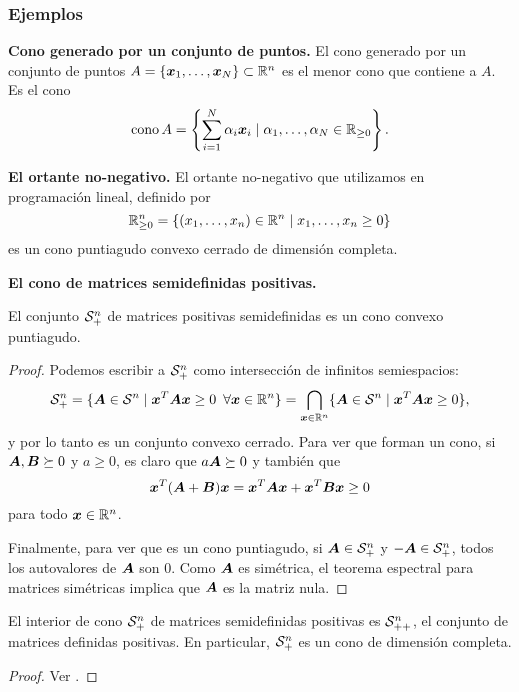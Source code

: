 \subsubsection{Ejemplos}

\noindent\textbf{Cono generado por un conjunto de puntos.}
El cono generado por un conjunto de puntos $A = \{\bm{x}_1, \dots, \bm{x}_N\} \subset \mathbb{R}^n$ es el menor cono que contiene a $A$. Es el cono
$$
\operatorname{cono} A = \left\{ \sum_{i=1}^N \alpha_i \bm{x}_i \mid \alpha_1, \dots, \alpha_N \in \mathbb{R}_{\ge 0}\right\}.
$$

\noindent\textbf{El ortante no-negativo.}
El ortante no-negativo que utilizamos en programación lineal, definido por
$$
\mathbb{R}^n_{\ge 0} = \{(x_1, \dots, x_n) \in \mathbb{R}^n \mid x_1, \dots, x_n \ge 0\}
$$
es un cono puntiagudo convexo cerrado de dimensión completa.

\noindent\textbf{El cono de matrices semidefinidas positivas.}

\begin{prop}
El conjunto ${\mathcal S_+^n}$ de matrices positivas semidefinidas es un cono convexo puntiagudo.
\end{prop}

\begin{proof}
Podemos escribir a ${\mathcal S_+^n}$ como intersección de infinitos semiespacios:
$$
{\mathcal S_+^n} = \{\bm{A} \in {\mathcal S^n} \mid \bm{x}^T \bm{A} \bm{x} \ge 0 \enspace \forall \bm{x} \in \mathbb{R}^n\} = \bigcap_{\bm{x}\in\mathbb{R}^n} \{\bm{A} \in {\mathcal S^n} \mid \bm{x}^T \bm{A} \bm{x} \ge 0\},
$$
y por lo tanto es un conjunto convexo cerrado.
Para ver que forman un cono, si $\bm{A}, \bm{B} \succeq 0$ y $a \ge 0$, es claro que $a \bm{A} \succeq 0$ y también que
$$\bm{x}^T (\bm{A} + \bm{B}) \bm{x} = \bm{x}^T \bm{A} \bm{x} + \bm{x}^T \bm{B} \bm{x} \ge 0$$
 para todo $\bm{x} \in \mathbb{R}^n$.

Finalmente, para ver que es un cono puntiagudo, si $\bm{A} \in {\mathcal S_+^n}$ y $-\bm{A} \in {\mathcal S_+^n}$, todos los autovalores de $\bm{A}$ son $0$. Como $\bm{A}$ es simétrica, el teorema espectral para matrices simétricas implica que $\bm{A}$ es la matriz nula.
\end{proof}

\begin{prop}
El interior de cono ${\mathcal S_+^n}$ de matrices semidefinidas positivas es ${\mathcal S_{++}^n}$, el conjunto de matrices definidas positivas. En particular, ${\mathcal S_+^n}$ es un cono de dimensión completa.
\end{prop}

\begin{proof}
Ver \cite[Teorema 3.1]{Fawzi2018}.
\end{proof}


